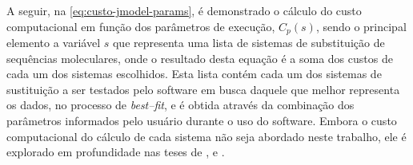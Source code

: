 \documentclass[english,brazilian]{UNISINOSmonografia} %
\begin{document}
A seguir, na \autoref{eq:custo-jmodel-params}, é demonstrado o cálculo do custo computacional em função dos parâmetros de execução, $ C_p(s) $, sendo o principal elemento a variável $ s $ que representa uma lista de sistemas de substituição de sequências moleculares, onde o resultado desta equação é a soma dos custos de cada um dos sistemas escolhidos. 
Esta lista contém cada um dos sistemas de sustituição a ser testados pelo software em busca daquele que melhor representa os dados, no processo de \textit{best--fit}, e é obtida através da combinação dos parâmetros informados pelo usuário durante o uso do software.
Embora o custo computacional do cálculo de cada sistema não seja abordado neste trabalho, ele é explorado em profundidade nas teses de ,  e .
\end{document}
